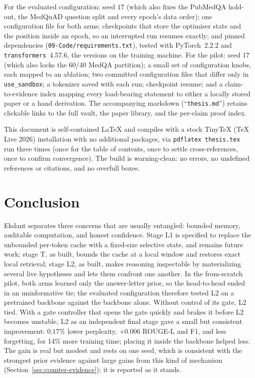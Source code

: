\documentclass[11pt,a4paper]{article}
\theoremstyle{plain}
\theoremstyle{definition}
\theoremstyle{remark}
\begin{document}
\noindent
For the evaluated configuration: seed $17$ (which also fixes the PubMedQA
hold-out, the MedQuAD question split and every epoch's data order); one
configuration file for both arms; checkpoints that store the optimiser
state and the position inside an epoch, so an interrupted run resumes exactly;
and pinned dependencies (\texttt{09-Code/requirements.txt}), tested with
PyTorch~2.2.2 and \texttt{transformers}~4.57.6, the versions on the training
machine.
For the pilot: seed $17$ (which also locks the 60/40 MedQA partition); a small set of
configuration knobs, each mapped to an ablation; two committed configuration
files that differ only in \texttt{use\_sandbox}; a tokenizer saved with each
run; checkpoint resume; and a claim-to-evidence index mapping every load-bearing statement to either a
locally stored paper or a hand derivation. The accompanying markdown
(``\texttt{thesis.md}'') retains clickable links to the full vault, the paper
library, and the per-claim proof index.

This document is self-contained LaTeX and compiles with a stock TinyTeX
(TeX Live 2026) installation with no additional packages, via
\texttt{pdflatex thesis.tex} run three times (once for the table of contents,
once to settle cross-references, once to confirm convergence). The build is
warning-clean: no errors, no undefined references or citations, and no overfull
boxes.

\section{Conclusion}

\noindent
Ekdant separates three concerns that are usually entangled: bounded memory,
auditable computation, and honest confidence. Stage L1 is specified to replace
the unbounded per-token cache with a fixed-size selective state, and remains
future work; stage T, as built, bounds the cache at a local window and
restores exact local retrieval; stage L2, as built, makes reasoning
inspectable by materializing several live hypotheses and lets them confront
one another. In the from-scratch pilot, both arms learned only the
answer-letter prior, so the head-to-head ended in an uninformative tie; the
evaluated configuration therefore tested L2 on a pretrained backbone against
the backbone alone. Without control of its gate, L2 tied. With a gate
controller that opens the gate quickly and brakes it before L2 becomes
unstable, L2 as an independent final stage gave a small but consistent
improvement: $0.17\%$ lower perplexity, $+0.006$ ROUGE-L and F1, and less
forgetting, for 14\% more training time; placing it inside the backbone
helped less. The gain is real but modest and rests on one seed, which is
consistent with the strongest prior evidence against large gains from this
kind of mechanism (Section~\ref{sec:counter-evidence}); it is reported as it
stands.
\end{document}
